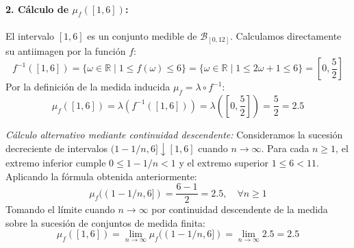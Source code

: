 \begin{problema}
\paragraph{2. Cálculo de $\mu_f([1, 6])$:}
El intervalo $[1, 6]$ es un conjunto medible de $\mathcal{B}_{[0,12]}$. Calculamos directamente su antiimagen por la función $f$:
\[
    f^{-1}([1, 6]) = \{\omega \in \mathbb{R} \mid 1 \le f(\omega) \le 6\} = \{\omega \in \mathbb{R} \mid 1 \le 2\omega + 1 \le 6\} = \left[0, \frac{5}{2}\right]
\]
Por la definición de la medida inducida $\mu_f = \lambda \circ f^{-1}$:
\[
    \mu_f([1, 6]) = \lambda(f^{-1}([1, 6])) = \lambda\left(\left[0, \frac{5}{2}\right]\right) = \frac{5}{2} = 2.5
\]

\textit{Cálculo alternativo mediante continuidad descendente:}
Consideramos la sucesión decreciente de intervalos $(1 - 1/n, 6] \downarrow [1, 6]$ cuando $n \to \infty$. Para cada $n \ge 1$, el extremo inferior cumple $0 \le 1 - 1/n < 1$ y el extremo superior $1 \le 6 < 11$. Aplicando la fórmula obtenida anteriormente:
\[
    \mu_f((1 - 1/n, 6]) = \frac{6 - 1}{2} = 2.5, \quad \forall n \ge 1
\]
Tomando el límite cuando $n \to \infty$ por continuidad descendente de la medida sobre la sucesión de conjuntos de medida finita:
\[
    \mu_f([1, 6]) = \lim_{n \to \infty} \mu_f((1 - 1/n, 6]) = \lim_{n \to \infty} 2.5 = 2.5
\]
\end{problema}
\newpage
